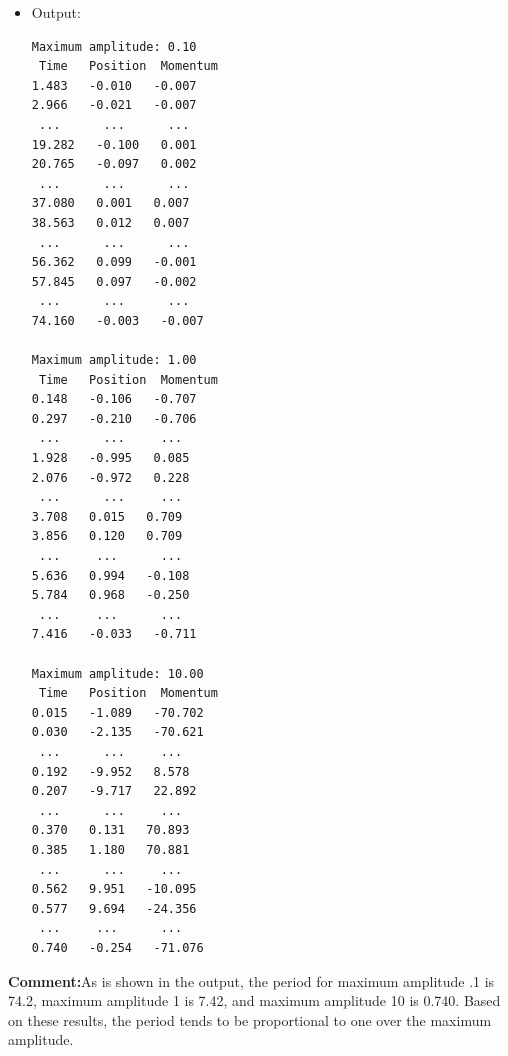 \documentclass[10pt]{article}
\begin{document}
\begin{itemize}
\begin{verbatim}
for (k = 0; k < 3; k++)
{
        x[0] = x_max[k];
        //implements maximum amplitude

        printf("\nMaximum amplitude: %.2f\n", x[0]);
        printf("  Time      Position    Momentum\n");
        
        x[1] = 0; //initializes p = 0
        t0 = 0; 
        n = 50000; //number of steps
        h = .001; //length of each step
        t = t0;

        /*loop below identifies where the first root of the oscillating
        function is located, which can then be multiplied by four to find
        the length of its period.*/

        for (i = 0; i < n; i++)
        {
                rk2(t, x, derivs, h, M); 
                // Call RK2
                if (x[0] >= 0)
                {
                        t += h;
                }
                else
                        break;
        }

        /*now that the period is found, can define tn and subsequently h*/
        
        tn = 4 * t;
        n = 50;
        t0 = 0;
        h = (tn - t0) / n;
        t = t0;
        
        for (j = 0; j < n; j++)
        {
                //Calls rk2
                rk2(t, x, derivs, h, M);
                //increments time by h until full period is reached
                t += h;
                printf("%f   %f   %f\n", t, x[0], x[1]);
        }
}

return 0;
}
\end{verbatim}
\item Output:
\begin{verbatim}
Maximum amplitude: 0.10
 Time   Position  Momentum
1.483   -0.010   -0.007
2.966   -0.021   -0.007
 ...      ...      ...
19.282   -0.100   0.001
20.765   -0.097   0.002
 ...      ...      ...
37.080   0.001   0.007
38.563   0.012   0.007
 ...      ...      ...
56.362   0.099   -0.001
57.845   0.097   -0.002
 ...      ...      ...
74.160   -0.003   -0.007

Maximum amplitude: 1.00
 Time   Position  Momentum
0.148   -0.106   -0.707
0.297   -0.210   -0.706
 ...      ...     ...
1.928   -0.995   0.085
2.076   -0.972   0.228
 ...      ...     ...
3.708   0.015   0.709
3.856   0.120   0.709
 ...     ...      ...
5.636   0.994   -0.108
5.784   0.968   -0.250
 ...     ...      ...
7.416   -0.033   -0.711

Maximum amplitude: 10.00
 Time   Position  Momentum
0.015   -1.089   -70.702
0.030   -2.135   -70.621
 ...      ...     ...  
0.192   -9.952   8.578
0.207   -9.717   22.892
 ...      ...     ...
0.370   0.131   70.893
0.385   1.180   70.881
 ...      ...     ...
0.562   9.951   -10.095
0.577   9.694   -24.356
 ...     ...      ...
0.740   -0.254   -71.076
\end{verbatim}
\end{itemize}
\textbf{Comment:}As is shown in the output, the period for maximum amplitude .1 is 74.2, maximum amplitude 1 is 7.42, and maximum amplitude 10 is 0.740. Based on these results, the period tends to be proportional to one over the maximum amplitude.
\end{document}
